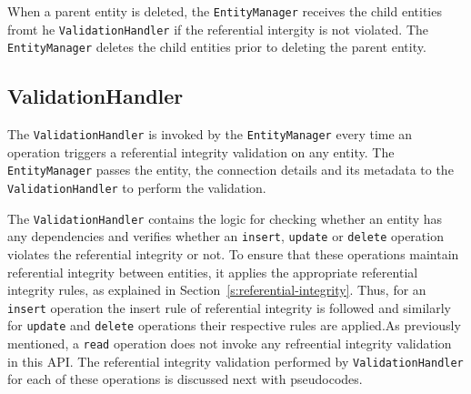  		When a parent entity is deleted, the \texttt{EntityManager} receives the
 		child entities fromt he \texttt{ValidationHandler} if the referential
 		intergity is not violated. The \texttt{EntityManager} deletes the child
 		entities prior to deleting the parent entity.
		
		\subsection{ValidationHandler}\label{ss:VH}
		The \texttt{ValidationHandler} is invoked by the \texttt{EntityManager} every time
		an operation triggers a
		referential integrity validation on any entity. 
		The \texttt{EntityManager} passes the entity,  the connection details and its
		metadata to the \texttt{ValidationHandler} to perform the validation.  
		
		The \texttt{ValidationHandler} contains the logic for checking whether an entity
		has any dependencies and verifies whether an \texttt{insert}, \texttt{update} or
		\texttt{delete} operation  violates the referential integrity or not.
		To ensure that these operations maintain referential integrity between entities,
		it applies the appropriate referential integrity rules, as explained in
		Section~\ref{s:referential-integrity}. Thus, for an \texttt{insert} operation
		the insert rule of referential integrity is followed and similarly for
		\texttt{update} and \texttt{delete} operations their respective rules are
		applied.As previously mentioned, a \texttt{read} operation does not invoke any
		refreential integrity validation in this \ac{API}. The referential
		integrity validation performed by \texttt{ValidationHandler} for each of these
		operations is discussed next with pseudocodes.
		
